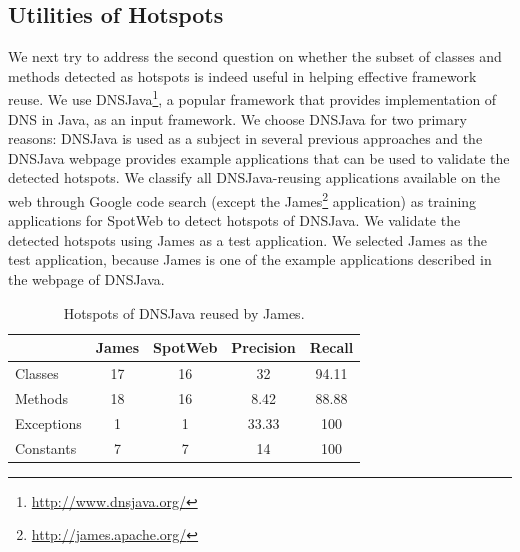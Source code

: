 \documentclass[conference]{IEEEtran}
\newenvironment{CodeOut}{\begin{small}}{\end{small}}
\begin{document}
\subsection{Utilities of Hotspots}
\label{sec:hotspotuse}
We next try to address the second question on whether the subset of classes and methods
detected as hotspots is indeed useful in helping effective framework reuse. 
We use DNSJava\footnote{\url{http://www.dnsjava.org/}},
a popular framework that provides implementation of DNS in Java, as an input framework. 
We choose DNSJava for two primary reasons: DNSJava is used as a subject in several
previous approaches and the DNSJava webpage provides example applications that can be used to validate
the detected hotspots. We classify all DNSJava-reusing applications available on the web through Google code search
(except the James\footnote{\url{http://james.apache.org/}} 
application) as training applications for SpotWeb to detect 
hotspots of DNSJava. We validate the detected hotspots using James as a test application.
We selected James as the test application, because James is one of the example applications
described in the webpage of DNSJava.

\setlength{\tabcolsep}{1pt}
\begin{table}[t]
\begin{CodeOut}
\begin{center}
\centering \caption {\label{tab:jamesres} Hotspots of DNSJava reused by James.}
\begin {tabular} {|l|c|c|c|c|}
\hline
&James&SpotWeb&Precision&Recall\\
\hline Classes&17&16&32&94.11\\
\hline Methods&18&16&8.42&88.88\\
\hline Exceptions&1&1&33.33&100\\
\hline Constants&7&7&14&100\\
\hline
\end{tabular}
\end{center}
\end{CodeOut}\vspace{-2ex}
\end{table}
\end{document}
